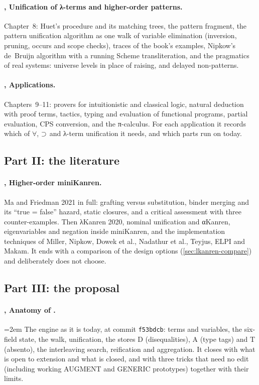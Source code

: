 \paragraph{, Unification of λ-terms and higher-order patterns.} Chapter~8: Huet's procedure
and its matching trees, the pattern fragment, the pattern unification algorithm as one walk of variable
elimination (inversion, pruning, occurs and scope checks), traces of the book's examples, Nipkow's
de~Bruijn algorithm with a running Scheme transliteration, and the pragmatics of real systems: universe
levels in place of raising, and delayed non-patterns.

\paragraph{, Applications.} Chapters~9--11: provers for intuitionistic and classical logic,
natural deduction with proof terms, tactics, typing and evaluation of functional programs, partial
evaluation, CPS conversion, and the π-calculus. For each application it records which of $\forall$, $\supset$
and λ-term unification it needs, and which parts run on \micro{} today.

\subsection*{Part II: the literature}

\paragraph{, Higher-order miniKanren.} Ma and Friedman 2021 in full: grafting versus
substitution, binder merging and its \enquote{true = false} hazard, static closures, and a critical assessment
with three counter-examples. Then λKanren 2020, nominal unification and αKanren, eigenvariables and negation
inside miniKanren, and the implementation techniques of Miller, Nipkow, Dowek et al., Nadathur et al.,
Teyjus, ELPI and Makam. It ends with a comparison of the design options (\cref{sec:lkanren-compare}) and
deliberately does not choose.

\subsection*{Part III: the proposal}

\paragraph{, Anatomy of \micro.} {\emergencystretch=2em The engine as it is today, at commit \texttt{f53bdcb}: terms
and variables, the six-field state, the walk, unification, the stores D (disequalities), A (type tags) and T
(absento), the interleaving search, reification and aggregation. It closes with what is open to extension and
what is closed, and with three tricks that need no edit (including working AUGMENT and GENERIC prototypes)
together with their limits.\par}

